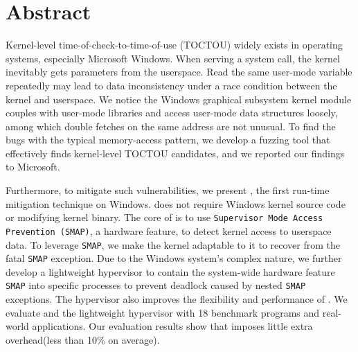 \section{Abstract}




Kernel-level time-of-check-to-time-of-use (TOCTOU) widely exists in operating systems, especially Microsoft Windows. When serving a system call, the kernel inevitably gets parameters from the userspace. Read the same user-mode variable repeatedly may lead to data inconsistency under a race condition between the kernel and userspace.  We notice the Windows graphical subsystem kernel module couples with user-mode libraries and access user-mode data structures loosely, among which double fetches on the same address are not unusual. To find the bugs with the typical memory-access pattern, we develop a fuzzing tool that effectively finds kernel-level TOCTOU candidates, and we reported our findings to Microsoft. 

Furthermore, to mitigate such vulnerabilities, we present \name, the first run-time mitigation technique on Windows. \name does not require Windows kernel source code or modifying kernel binary. The core of \name is to use \texttt{Supervisor Mode Access Prevention (SMAP)}, a hardware feature, to detect kernel access to userspace data. To leverage \texttt{SMAP}, we make the kernel adaptable to it to recover from the fatal \texttt{SMAP} exception. Due to the Windows system's complex nature, we further develop a lightweight hypervisor to contain the system-wide hardware feature \texttt{SMAP} into specific processes to prevent deadlock caused by nested \texttt{SMAP} exceptions. The hypervisor also improves the flexibility and performance of \name. We evaluate \name and the lightweight hypervisor with 18 benchmark programs and real-world applications. Our evaluation results show that \name imposes little extra overhead(less than 10\% on average).

